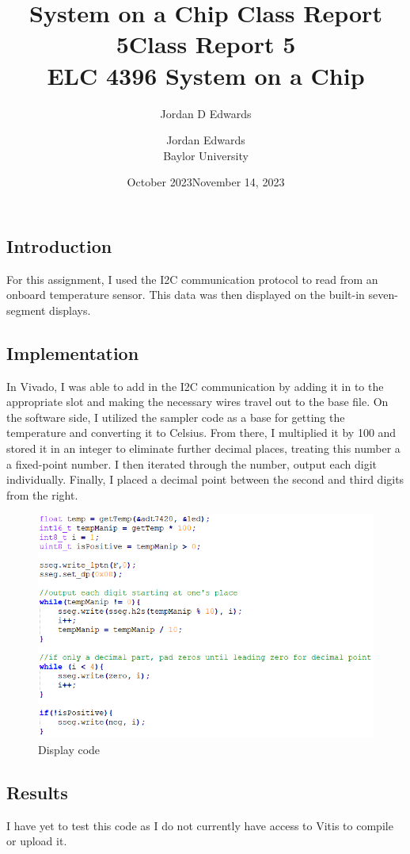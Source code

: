 \documentclass{article}
\title{System on a Chip Class Report 5}
\author{Jordan D Edwards}
\date{October 2023}
\begin{document}
	
	\title{Class Report 5
		\\ \large{ELC 4396 System on a Chip}  }
	
	\author{Jordan Edwards \\ Baylor University} %
	\date{November 14, 2023}
	\maketitle
	
	\subsection*{Introduction}
	For this assignment, I used the I2C communication protocol to read from an onboard temperature sensor. This data was then displayed on the built-in seven-segment displays.
	
	
	\subsection*{Implementation}
	In Vivado, I was able to add in the I2C communication by adding it in to the appropriate slot and making the necessary wires travel out to the base file. On the software side, I utilized the sampler code as a base for getting the temperature and converting it to Celsius. From there, I multiplied it by 100 and stored it in an integer to eliminate further decimal places, treating this number a a fixed-point number. I then iterated through the number, output each digit individually. Finally, I placed a decimal point between the second and third digits from the right.
	
	\begin{figure}[H]
		\centering
		\includegraphics[width=\linewidth]{code}
		\caption{Display code}
		\label{fig:code}
	\end{figure}
	
	\subsection*{Results}
	I have yet to test this code as I do not currently have access to Vitis to compile or upload it.
\end{document}
